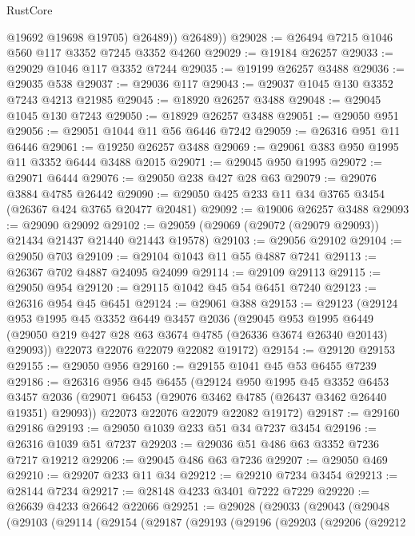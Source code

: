 \begin{lexlean}{RustCore}
\begin{coremodule}
              @19692
              @19698
              @19705)
            @26489))
        @26489))
@29028 := @26494 @7215 @1046 @560 @117 @3352 @7245 @3352 @4260
@29029 := @19184 @26257
@29033 := @29029 @1046 @117 @3352 @7244
@29035 := @19199 @26257 @3488
@29036 := @29035 @538
@29037 := @29036 @117
@29043 := @29037 @1045 @130 @3352 @7243 @4213 @21985
@29045 := @18920 @26257 @3488
@29048 := @29045 @1045 @130 @7243
@29050 := @18929 @26257 @3488
@29051 := @29050 @951
@29056 := @29051 @1044 @11 @56 @6446 @7242
@29059 := @26316 @951 @11 @6446
@29061 := @19250 @26257 @3488
@29069 := @29061 @383 @950 @1995 @11 @3352 @6444 @3488 @2015
@29071 := @29045 @950 @1995
@29072 := @29071 @6444
@29076 := @29050 @238 @427 @28 @63
@29079 := @29076 @3884 @4785 @26442
@29090 := @29050 @425 @233 @11 @34 @3765 @3454 (@26367 @424 @3765 @20477 @20481)
@29092 := @19006 @26257 @3488
@29093 := @29090 @29092
@29102 := @29059 (@29069 (@29072 (@29079 @29093)) @21434 @21437 @21440 @21443 @19578)
@29103 := @29056 @29102
@29104 := @29050 @703
@29109 := @29104 @1043 @11 @55 @4887 @7241
@29113 := @26367 @702 @4887 @24095 @24099
@29114 := @29109 @29113
@29115 := @29050 @954
@29120 := @29115 @1042 @45 @54 @6451 @7240
@29123 := @26316 @954 @45 @6451
@29124 := @29061 @388
@29153 := @29123
    (@29124
      @953
      @1995
      @45
      @3352
      @6449
      @3457
      @2036
      (@29045
        @953
        @1995
        @6449
        (@29050 @219 @427 @28 @63 @3674 @4785 (@26336 @3674 @26340 @20143) @29093))
      @22073
      @22076
      @22079
      @22082
      @19172)
@29154 := @29120 @29153
@29155 := @29050 @956
@29160 := @29155 @1041 @45 @53 @6455 @7239
@29186 := @26316
    @956
    @45
    @6455
    (@29124
      @950
      @1995
      @45
      @3352
      @6453
      @3457
      @2036
      (@29071 @6453 (@29076 @3462 @4785 (@26437 @3462 @26440 @19351) @29093))
      @22073
      @22076
      @22079
      @22082
      @19172)
@29187 := @29160 @29186
@29193 := @29050 @1039 @233 @51 @34 @7237 @3454
@29196 := @26316 @1039 @51 @7237
@29203 := @29036 @51 @486 @63 @3352 @7236 @7217 @19212
@29206 := @29045 @486 @63 @7236
@29207 := @29050 @469
@29210 := @29207 @233 @11 @34
@29212 := @29210 @7234 @3454
@29213 := @28144 @7234
@29217 := @28148 @4233 @3401 @7222 @7229
@29220 := @26639 @4233 @26642 @22066
@29251 := @29028
    (@29033
      (@29043
        (@29048
          (@29103
            (@29114
              (@29154
                (@29187
                  (@29193
                    (@29196
                      (@29203
                        (@29206
                          (@29212

\end{coremodule}
\end{lexlean}
